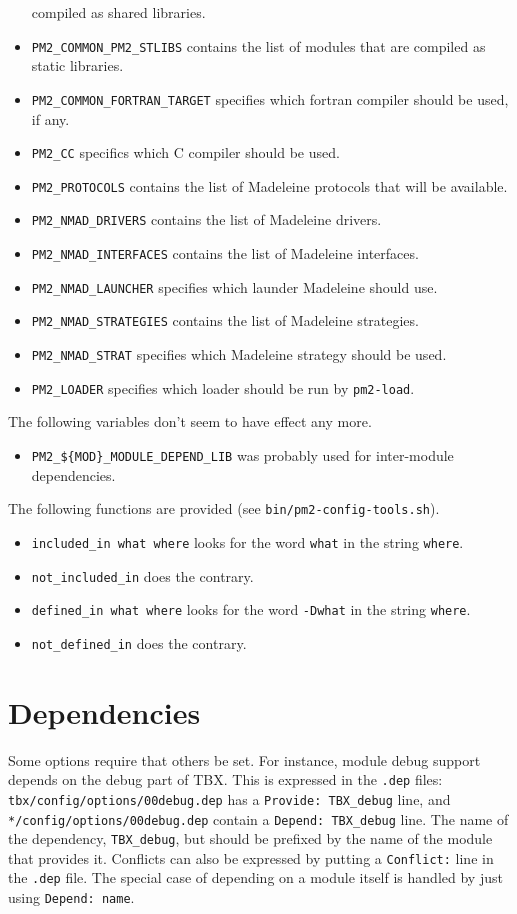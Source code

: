 \documentclass[11pt, a4paper ,twoside]{article}
\begin{document}
\begin{itemize}
compiled as shared libraries.
\item \verb+PM2_COMMON_PM2_STLIBS+ contains the list of modules that are
compiled as static libraries.
\item \verb+PM2_COMMON_FORTRAN_TARGET+ specifies which fortran compiler
should be used, if any.
\item \verb+PM2_CC+ specifics which C compiler should be used.
\item \verb+PM2_PROTOCOLS+ contains the list of Madeleine protocols that
will be available.
\item \verb+PM2_NMAD_DRIVERS+ contains the list of Madeleine drivers.
\item \verb+PM2_NMAD_INTERFACES+ contains the list of Madeleine
interfaces.
\item \verb+PM2_NMAD_LAUNCHER+ specifies which launder Madeleine should
use.
\item \verb+PM2_NMAD_STRATEGIES+ contains the list of Madeleine
strategies.
\item \verb+PM2_NMAD_STRAT+ specifies which Madeleine strategy should
be used.
\item \verb+PM2_LOADER+ specifies which loader should be run by
\verb+pm2-load+.
\end{itemize}

The following variables don't seem to have effect any more.
\begin{itemize}
\item \verb+PM2_${MOD}_MODULE_DEPEND_LIB+ was probably used for
inter-module dependencies.
\end{itemize}

The following functions are provided (see \verb+bin/pm2-config-tools.sh+).
\begin{itemize}
\item \verb+included_in what where+ looks for the word \verb+what+ in
the string \verb+where+.
\item \verb+not_included_in+ does the contrary.
\item \verb+defined_in what where+ looks for the word \verb+-Dwhat+ in
the string \verb+where+.
\item \verb+not_defined_in+ does the contrary.
\end{itemize}


\section{Dependencies}

Some options require that others be set.  For instance, module debug
support depends on the debug part of TBX.  This is expressed in
the \verb+.dep+ files: \verb+tbx/config/options/00debug.dep+ has a
\verb+Provide: TBX_debug+ line, and \verb+*/config/options/00debug.dep+
contain a \verb+Depend: TBX_debug+ line. The name of the dependency,
\verb+TBX_debug+, but should be prefixed by the name of the module that
provides it. Conflicts can also be expressed by putting a
\verb+Conflict:+ line in the \verb+.dep+ file. The special case of
depending on a module itself is handled by just using
\verb+Depend: name+.
\end{document}
